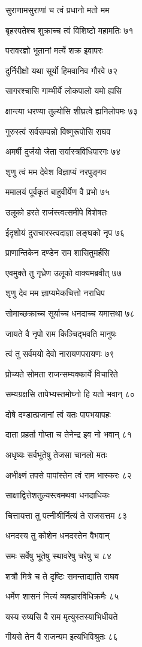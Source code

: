 सुराणामसुराणां च त्वं प्रधानो मतो मम

बृहस्पतेश्च शुक्राच्च त्वं विशिष्टो महामतिः ७१

परावरज्ञो भूतानां मर्त्ये शक्र इवापरः

दुर्निरीक्षो यथा सूर्यो हिमवानिव गौरवे ७२

सागरश्चासि गाम्भीर्ये लोकपालो यमो ह्यसि

क्षान्त्या धरण्या तुल्योसि शीघ्रत्वे ह्यनिलोपमः ७३

गुरुस्त्वं सर्वसम्पन्नो विष्णुरूपोसि राघव

अमर्षी दुर्जयो जेता सर्वास्त्रविधिपारगः ७४

शृणु त्वं मम देवेश विज्ञाप्यं नरपुङ्गव

ममालयं पूर्वकृतं बाहुवीर्येण वै प्रभो ७५

उलूको हरते राजंस्त्वत्समीपे विशेषतः

ईदृशोयं दुराचारस्त्वदाज्ञा लङ्घको नृप ७६

प्राणान्तिकेन दण्डेन राम शासितुमर्हसि

एवमुक्ते तु गृध्रेण उलूको वाक्यमब्रवीत् ७७

शृणु देव मम ज्ञाप्यमेकचित्तो नराधिप

सोमाच्छक्राच्च सूर्याच्च धनदाच्च यमात्तथा ७८

जायते वै नृपो राम किञ्चिद्भवति मानुषः

त्वं तु सर्वमयो देवो नारायणपरायणः ७९

प्रोच्यते सोमता राजन्सम्यक्कार्ये विचारिते

सम्यग्रक्षसि तापेभ्यस्तमोघ्नो हि यतो भवान् ८०

दोषे दण्डात्प्रजानां त्वं यतः पापभयापहः

दाता प्रहर्ता गोप्ता च तेनेन्द्र इव नो भवान् ८१

अधृष्यः सर्वभूतेषु तेजसा चानलो मतः

अभीक्ष्णं तपसे पापांस्तेन त्वं राम भास्करः ८२

साक्षाद्वित्तेशतुल्यस्त्वमथवा धनदाधिकः

चित्तायत्ता तु पत्नीश्रीर्नित्यं ते राजसत्तम ८३

धनदस्य तु कोशेन धनदस्तेन वैभवान्

समः सर्वेषु भूतेषु स्थावरेषु चरेषु च ८४

शत्रौ मित्रे च ते दृष्टिः समन्ताद्याति राघव

धर्मेण शासनं नित्यं व्यवहारविधिक्रमैः ८५

यस्य रुष्यसि वै राम मृत्युस्तस्याभिधीयते

गीयसे तेन वै राजन्यम इत्यभिविश्रुतः ८६

